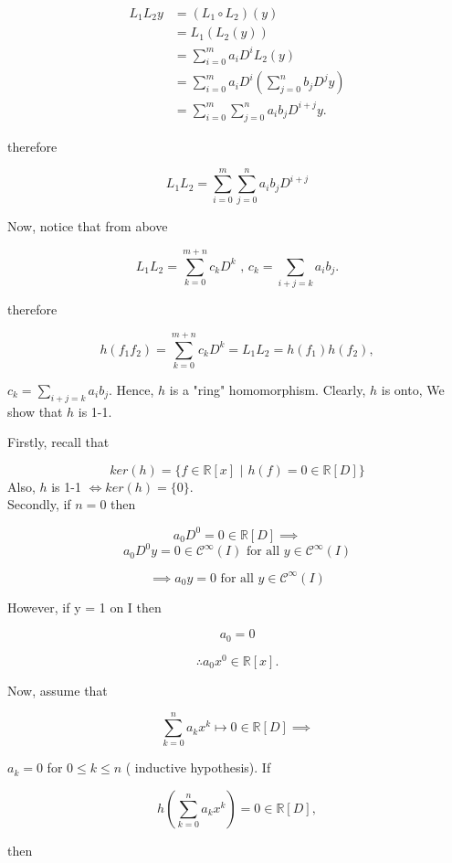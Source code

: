 \documentclass{article}
\theoremstyle{definition}
\begin{document}
\hrulefill

\begin{align*}
  L_1 L_2 y &= (L_1 \circ L_2)(y)\\
  &= L_1(L_2(y)) \\
  &= \sum_{i=0}^m a_iD^iL_2(y) \\
  &= \sum_{i=0}^m a_iD^i\left(\sum_{j=0}^n b_jD^jy\right) \\
  &= \sum_{i=0}^m \sum_{j=0}^n a_ib_jD^{i+j}y.
\end{align*}

therefore 

\[ L_1 L_2 = \sum_{i=0}^m \sum_{j=0}^n a_ib_jD^{i+j}\]


Now, notice that from above 

\[ L_1 L_2 = \sum_{k=0}^{m+n}c_kD^k \text{ , } c_k = \sum_{i+j=k} a_ib_j.\]

therefore

\[ h(f_1 f_2) = \sum_{k=0}^{m+n}c_kD^k = L_1L_2 = h(f_1)h(f_2), \]

\( c_k = \sum_{i+j=k} a_ib_j \).  Hence, \( h \) is a "ring"
homomorphism. Clearly, \( h \) is onto, We show that \( h \) is 1-1. 

Firstly, recall that 

\[ ker(h)= \{ f \in \mathbb{R}[x] \text{ | } h(f) = 0 \in \mathbb{R}[D]
\} \]
Also, \( h \) is 1-1 \( \iff ker(h) = \{0\} \). \\[5mm]

Secondly, if \( n=0 \) then 

\[ a_0D^0 = 0 \in \mathbb{R}[D] \implies  \]
\[ a_0D^0y = 0 \in  \mathscr{C}^{\infty} (I) \text{ for all } y \in
\mathscr{C}^{\infty} (I)\]

\[ \implies a_0y = 0 \text{ for all } y \in \mathscr{C}^{\infty} (I) \]

However, if y = 1 on I then 

\[ a_0 = 0  \]

\[\therefore a_0x^0 \in \mathbb{R}[x]. \]


Now, assume that 

\[ \sum_{k=0}^n a_kx^k  \mapsto 0 \in \mathbb{R}[D] \implies\]

\( a_k =0  \) for \(  0 \leq k \leq n \) ( inductive hypothesis). If 

\[ h \left(  \sum_{k=0}^n a_kx^k\right) = 0 \in \mathbb{R}[D] , \]

then
\end{document}
